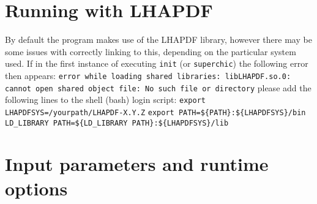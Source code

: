 \documentclass[12pt]{article}
\begin{document}
\section{Running with LHAPDF}

By default the program makes use of the LHAPDF library, however there 
may be some issues with correctly linking to this, depending on the 
particular system used. 
If in the first instance of executing \texttt{init} (or
 \texttt{superchic}) the following error then appears:
\newline
\newline
\texttt{error while loading shared libraries: libLHAPDF.so.0: cannot 
open shared object file: No such file or directory}
\newline
\newline
please add the following lines to the shell (bash) login script:
\newline
\newline
\texttt{export LHAPDFSYS=/yourpath/LHAPDF-X.Y.Z}
\newline
\texttt{export PATH=\$\{PATH\}:\$\{LHAPDFSYS\}/bin}
\newline
\texttt{LD\_LIBRARY PATH=\$\{LD\_LIBRARY PATH\}:\$\{LHAPDFSYS\}/lib}


\section{Input parameters and runtime options}
\end{document}

